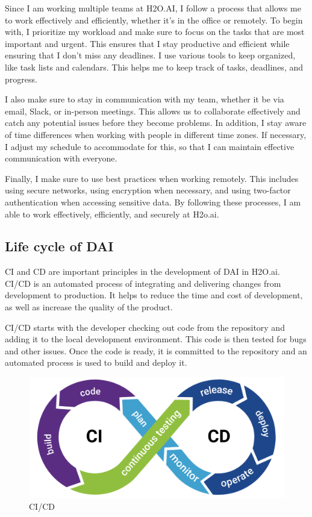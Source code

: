 \documentclass[12pt,a4paper]{report}
\begin{document}
Since I am working multiple teams at H2O.AI, I follow a process that allows me to work effectively and efficiently, whether it's in the office or remotely. To begin with, I prioritize my workload and make sure to focus on the tasks that are most important and urgent. This ensures that I stay productive and efficient while ensuring that I don't miss any deadlines. I use various tools to keep organized, like task lists and calendars. This helps me to keep track of tasks, deadlines, and progress.

I also make sure to stay in communication with my team, whether it be via email, Slack, or in-person meetings. This allows us to collaborate effectively and catch any potential issues before they become problems. In addition, I stay aware of time differences when working with people in different time zones. If necessary, I adjust my schedule to accommodate for this, so that I can maintain effective communication with everyone.

Finally, I make sure to use best practices when working remotely. This includes using secure networks, using encryption when necessary, and using two-factor authentication when accessing sensitive data. By following these processes, I am able to work effectively, efficiently, and securely at H2o.ai.

\subsection*{Life cycle of \ac{DAI}}

\ac{CI} and \ac{CD} are important principles in the development of \ac{DAI} in H2O.ai. CI/CD\cite{noauthor_what_nodate} is an automated process of integrating and delivering changes from development to production. It helps to reduce the time and cost of development, as well as increase the quality of the product.

CI/CD starts with the developer checking out code from the repository and adding it to the local development environment. This code is then tested for bugs and other issues. Once the code is ready, it is committed to the repository and an automated process is used to build and deploy it.

\begin{figure}[H]
\centering
\includegraphics[width=0.5\linewidth]{cicd.png}
\caption{CI/CD}
\end{figure}
\end{document}
